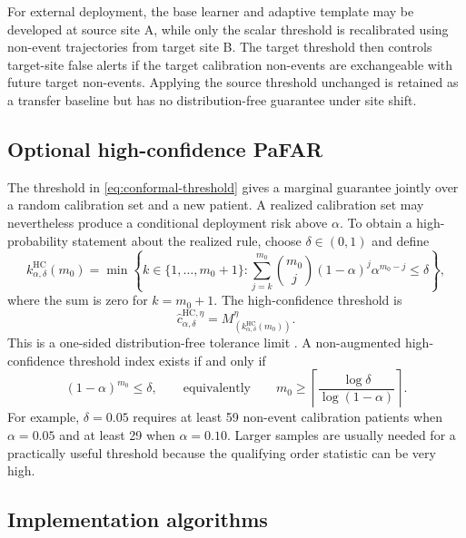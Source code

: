 \documentclass[11pt]{article}
\begin{document}
For external deployment, the base learner and adaptive template may be developed at source site A, while only the scalar threshold is recalibrated using non-event trajectories from target site B. The target threshold then controls target-site false alerts if the target calibration non-events are exchangeable with future target non-events. Applying the source threshold unchanged is retained as a transfer baseline but has no distribution-free guarantee under site shift.

\subsection{Optional high-confidence PaFAR}

The threshold in \eqref{eq:conformal-threshold} gives a marginal guarantee jointly over a random calibration set and a new patient. A realized calibration set may nevertheless produce a conditional deployment risk above $\alpha$. To obtain a high-probability statement about the realized rule, choose $\delta\in(0,1)$ and define
\begin{equation}
k_{\alpha,\delta}^{\mathrm{HC}}(m_0)
=\min\left\{k\in\{1,\ldots,m_0+1\}:
\sum_{j=k}^{m_0}\binom{m_0}{j}(1-\alpha)^j\alpha^{m_0-j}
\le\delta\right\},
\label{eq:hc-index}
\end{equation}
where the sum is zero for $k=m_0+1$. The high-confidence threshold is
\begin{equation}
\widehat c_{\alpha,\delta}^{\mathrm{HC},\eta}
=M_{(k_{\alpha,\delta}^{\mathrm{HC}}(m_0))}^{\eta}.
\label{eq:hc-threshold}
\end{equation}
This is a one-sided distribution-free tolerance limit \citep{wilks1941determination}. A non-augmented high-confidence threshold index exists if and only if
\begin{equation}
(1-\alpha)^{m_0}\le\delta,
\qquad\text{equivalently}\qquad
m_0\ge\left\lceil\frac{\log\delta}{\log(1-\alpha)}\right\rceil.
\label{eq:hc-min-sample}
\end{equation}
For example, $\delta=0.05$ requires at least 59 non-event calibration patients when $\alpha=0.05$ and at least 29 when $\alpha=0.10$. Larger samples are usually needed for a practically useful threshold because the qualifying order statistic can be very high.

\subsection{Implementation algorithms}
\end{document}
